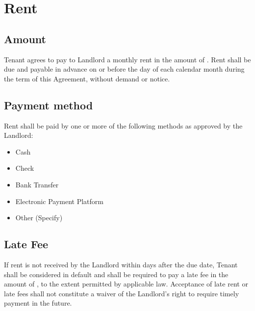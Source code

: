 
\section{Rent}
\label{sec:rent}

\subsection{Amount}
\label{sec:amount}

Tenant agrees to pay to Landlord a monthly rent in the amount of \LeaseAmount{}. Rent shall be due and payable in advance on or before the \LeaseDueDate{} day of each calendar month during the term of this Agreement, without demand or notice.

\subsection{Payment method}
\label{sec:paymentmethod}

Rent shall be paid by one or more of the following methods as approved by the Landlord: 
\begin{itemize}
  \item[$\square$] Cash
  \item[$\square$] Check
  \item[$\square$] Bank Transfer
  \item[$\square$] Electronic Payment Platform
  \item[$\square$] Other (Specify)
\end{itemize}

\subsection{Late Fee}
\label{sec:latefee}

If rent is not received by the Landlord within \LateFeeGracePeriod{} days after the due date, Tenant shall be considered in default and shall be required to pay a late fee in the amount of \LateFeeAmount{}, to the extent permitted by applicable law. Acceptance of late rent or late fees shall not constitute a waiver of the Landlord’s right to require timely payment in the future.

